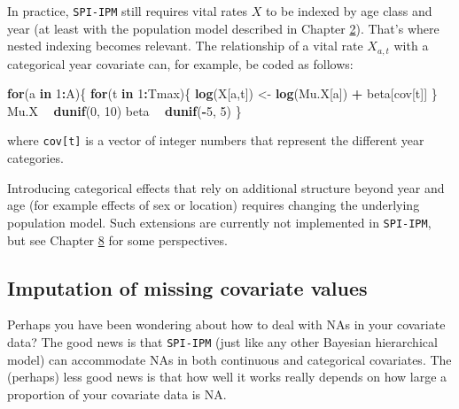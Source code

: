 \documentclass[
]{book}
\newenvironment{Shaded}{\begin{snugshade}}{\end{snugshade}}
\newcommand{\ControlFlowTok}[1]{\textcolor[rgb]{0.13,0.29,0.53}{\textbf{#1}}}
\newcommand{\DecValTok}[1]{\textcolor[rgb]{0.00,0.00,0.81}{#1}}
\newcommand{\KeywordTok}[1]{\textcolor[rgb]{0.13,0.29,0.53}{\textbf{#1}}}
\newcommand{\NormalTok}[1]{#1}
\newcommand{\OperatorTok}[1]{\textcolor[rgb]{0.81,0.36,0.00}{\textbf{#1}}}
\newcommand{\StringTok}[1]{\textcolor[rgb]{0.31,0.60,0.02}{#1}}
\begin{document}
In practice, \texttt{SPI-IPM} still requires vital rates \(X\) to be indexed by age class
and year (at least with the population model described in Chapter \protect\hyperlink{ux5cux2520IPMux5cux2520Construction}{2}).
That's where nested indexing becomes relevant.
The relationship of a vital rate \(X_{a,t}\) with a categorical year covariate can,
for example, be coded as follows:

\begin{Shaded}
\begin{Highlighting}[]
\ControlFlowTok{for}\NormalTok{(a }\ControlFlowTok{in} \DecValTok{1}\OperatorTok{:}\NormalTok{A)\{}
  \ControlFlowTok{for}\NormalTok{(t }\ControlFlowTok{in} \DecValTok{1}\OperatorTok{:}\NormalTok{Tmax)\{}
      \KeywordTok{log}\NormalTok{(X[a,t]) <-}\StringTok{ }\KeywordTok{log}\NormalTok{(Mu.X[a]) }\OperatorTok{+}\StringTok{ }\NormalTok{beta[cov[t]]}
\NormalTok{  \}}
\NormalTok{  Mu.X }\OperatorTok{~}\StringTok{ }\KeywordTok{dunif}\NormalTok{(}\DecValTok{0}\NormalTok{, }\DecValTok{10}\NormalTok{)}
\NormalTok{  beta }\OperatorTok{~}\StringTok{ }\KeywordTok{dunif}\NormalTok{(}\OperatorTok{-}\DecValTok{5}\NormalTok{, }\DecValTok{5}\NormalTok{)}
\NormalTok{\}}
\end{Highlighting}
\end{Shaded}

where \texttt{cov{[}t{]}} is a vector of integer numbers that represent the different year
categories.

Introducing categorical effects that rely on additional structure beyond year
and age (for example effects of sex or location) requires changing the underlying
population model. Such extensions are currently not implemented in \texttt{SPI-IPM},
but see Chapter \protect\hyperlink{ux5cux2520Usefulux5cux2520extensionsux5cux2520andux5cux2520outlook}{8} for some perspectives.

\hypertarget{imputation-of-missing-covariate-values}{%
\subsection{Imputation of missing covariate values}\label{imputation-of-missing-covariate-values}}

Perhaps you have been wondering about how to deal with NAs in your covariate
data? The good news is that \texttt{SPI-IPM} (just like any other Bayesian
hierarchical model) can accommodate NAs in both continuous and categorical
covariates. The (perhaps) less good news is that how well it works really
depends on how large a proportion of your covariate data is NA.
\end{document}
